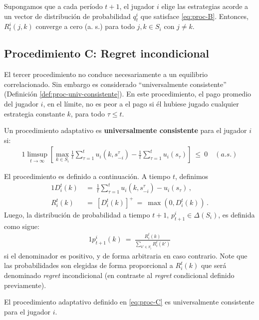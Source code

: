 \begin{theorem}
Supongamos que a cada período $t+1$, el jugador $i$ elige las estrategias acorde a un vector de distribución de probabilidad $q_t^i$ que satisface \eqref{eq:proc-B}. Entonces, $R^i_t(j, k)$ converge a cero (a. s.) para todo $j, k \in S_i$ con $j \neq k$.
\end{theorem}

\subsection*{Procedimiento C: Regret incondicional}

El tercer procedimiento no conduce necesariamente a un equilibrio correlacionado. Sin embargo es considerado ``universalmente consistente'' (Definición \ref{def:proc-univ-consistente}). En este procedimiento, el pago promedio del jugador $i$, en el límite, no es peor a el pago si él hubiese jugado cualquier estrategia constante $k$, para todo $\tau \leq t$.

\begin{definition}
\label{def:proc-univ-consistente}
Un procedimiento adaptativo es \textbf{universalmente consistente} para el jugador $i$ si:
\begin{alignat}{1}
	\limsup_{t \rightarrow \infty } \left[ \max_{k \in S_i} \frac{1}{t} \sum_{\tau = 1}^{t} u_i(k, s_{-i}^{\tau}) - \frac{1}{t} \sum_{\tau = 1}^{t} u_i(s_{\tau}) \right]\ \leq\ 0\quad (a. s.)
\end{alignat}
\end{definition}
El procedimiento es definido a continuación. A tiempo $t$, definimos
\begin{alignat}{1}
D_i^t(k)\ &=\ \frac{1}{t} \sum_{\tau = 1}^{t} u_i(k, s_{-i}^{\tau}) - u_i(s_{\tau}) \,, \\
R_i^t(k)\ &=\ [D_i^t(k)]^+\ =\ \max(0, D_i^t(k)) \,.
\end{alignat}
Luego, la distribución de probabilidad a tiempo $t+1$, $p_{t+1}^i \in \Delta(S_i)$, es definida como sigue:
\begin{alignat}{1}
\label{eq:proc-C}
  p_{t+1}^i(k)\ =\ \frac{R_i^t(k)}{\sum_{k'\in S_i} R_i^t(k')}
\end{alignat}
si el denominador es positivo, y de forma arbitraria en caso contrario. Note que las probabilidades son elegidas de forma proporcional a $R_i^t(k)$ que será denominado \textit{regret} incondicional (en contraste al \textit{regret} condicional definido previamente).

\begin{theorem}
\label{theo:conv-proc-C}
El procedimiento adaptativo definido en \eqref{eq:proc-C} es universalmente consistente para el jugador $i$.
\end{theorem}


